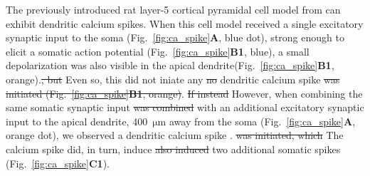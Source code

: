 \documentclass[preprint,10pt,authoryear]{elsarticle}
\newcommand{\sntxt}[1]{{\color{NavyBlue}#1}}
\begin{document}
The previously introduced rat layer-5 cortical pyramidal cell model from \cite{HAY2011} can exhibit dendritic calcium spikes.
When this cell model received a single excitatory synaptic input to the soma (Fig.~\ref{fig:ca_spike}\textbf{A}, blue dot), strong enough to elicit a somatic action potential (Fig.~\ref{fig:ca_spike}\textbf{B1}, blue), a small depolarization was also visible in the apical dendrite\sntxt{(Fig.~\ref{fig:ca_spike}\textbf{B1}, orange).\sout{, but} Even so, this did not iniate any}\sntxt{\sout{ no}} dendritic calcium spike \sntxt{\sout{was initiated (Fig.~\ref{fig:ca_spike}\textbf{B1}, orange)}}. \sntxt{\sout{If instead} However, when combining} the same somatic synaptic input \sntxt{\sout{was combined}} with an additional excitatory synaptic input to the apical dendrite, 400~$\si{\um}$ away from the soma (Fig.~\ref{fig:ca_spike}\textbf{A}, orange dot), \sntxt{we observed a} dendritic calcium spike \sntxt{. \sout{was initiated, which}} The calcium spike did, in turn, induce \sntxt{\sout{ also induced}} two additional somatic spikes (Fig.~\ref{fig:ca_spike}\textbf{C1}).
\end{document}
